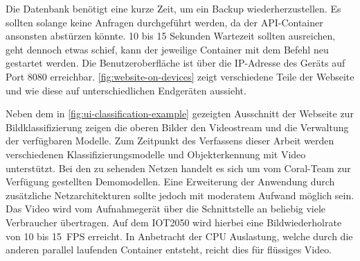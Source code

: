 Die Datenbank benötigt eine kurze Zeit,
um ein Backup wiederherzustellen.
Es sollten solange keine Anfragen durchgeführt werden,
da der API-Container ansonsten abstürzen könnte.
10 bis 15 Sekunden Wartezeit sollten ausreichen, geht dennoch etwas schief,
kann der jeweilige Container mit
dem Befehl  neu gestartet werden.
Die Benutzeroberfläche ist über die IP-Adresse des Geräts
auf Port 8080 erreichbar.
\autoref{fig:website-on-devices} zeigt verschiedene
Teile der Webseite und wie diese auf unterschiedlichen Endgeräten aussieht.
\newpage


\noindent
Neben dem in \autoref{fig:ui-classification-example} gezeigten
Ausschnitt der Webseite zur Bildklassifizierung zeigen die
oberen Bilder den Videostream und die Verwaltung der verfügbaren
Modelle. Zum Zeitpunkt des Verfassens dieser Arbeit werden
verschiedenen Klassifizierungsmodelle und Objekterkennung
mit Video unterstützt. Bei den zu sehenden Netzen
handelt es sich um vom Coral-Team zur Verfügung gestellten
Demomodellen. Eine Erweiterung der Anwendung
durch zusätzliche Netzarchitekturen sollte
jedoch mit moderatem Aufwand möglich sein.
Das Video wird vom Aufnahmegerät über die Schnittstelle
an beliebig viele Verbraucher übertragen.
Auf dem IOT2050 wird hierbei eine
Bildwiederholrate von 10 bis \qty{15}{FPS} erreicht.
In Anbetracht der CPU Auslastung, welche durch die anderen
parallel laufenden Container entsteht,
reicht dies für flüssiges Video.